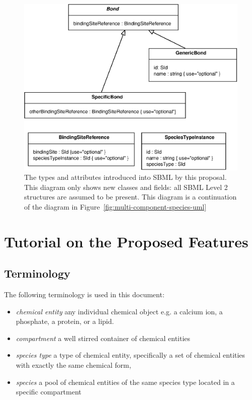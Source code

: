 \documentclass{cekarticle}
\begin{document}
\begin{figure}[h]
  \vspace*{8pt}
  \centering
  \includegraphics[scale = 0.7]{multi-component-species-uml2.eps}
  \caption{The types and attributes introduced into SBML by this proposal.  This diagram
  only shows new classes and fields: all SBML Level 2 structures are assumed to be present.
  This diagram is a continuation of the diagram in Figure~\ref{fig:multi-component-species-uml}}
  \label{fig:multi-component-species-uml2}
\end{figure}

\clearpage

\section{Tutorial on the Proposed Features}
\label{sec:tutorial}

\subsection{Terminology}

The following terminology is used in this document:
\begin{itemize}
\item \emph{chemical entity} any individual chemical object
  e.g. a calcium ion, a phosphate, a protein, or a lipid.

\item \emph{compartment} a well stirred container of chemical entities

\item \emph{species type} a type of chemical entity,
  specifically a set of chemical entities with exactly the same chemical form,

\item \emph{species} a pool of chemical entities of the same species type located in a
  specific compartment
\end{itemize}
\end{document}
